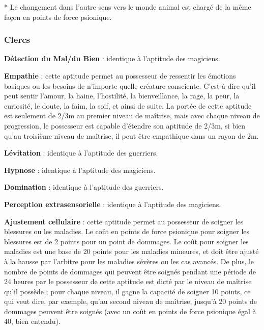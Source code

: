 {\bigskip

* Le changement dans l'autre sens vers le monde animal est chargé de la même façon en points de force psionique.

\subsubsection*{Clercs}

\textbf{Détection du Mal/du Bien} : identique à l'aptitude des magiciens.

\bigskip

\textbf{Empathie} : cette aptitude permet au possesseur de ressentir les émotions basiques ou les besoins de n'importe quelle créature consciente. C'est-à-dire qu'il peut sentir l'amour, la haine, l'hostilité, la bienveillance, la rage, la peur, la curiosité, le doute, la faim, la soif, et ainsi de suite. La portée de cette aptitude est seulement de 2/3m au premier niveau de maîtrise, mais avec chaque niveau de progression, le possesseur est capable d'étendre son aptitude de 2/3m, si bien qu'au troisième niveau de maîtrise, il peut être empathique dans un rayon de 2m.

\bigskip

\textbf{Lévitation} : identique à l'aptitude des guerriers.

\bigskip

\textbf{Hypnose} : identique à l'aptitude des magiciens.

\bigskip

\textbf{Domination} : identique à l'aptitude des guerriers.

\bigskip

\textbf{Perception extrasensorielle} : identique à l'aptitude des magiciens.

\bigskip

\textbf{Ajustement cellulaire} : cette aptitude permet au possesseur de soigner les blessures ou les maladies. Le coût en points de force psionique pour soigner les blessures est de 2 points pour un point de dommages. Le coût pour soigner les maladies est une base de 20 points pour les maladies mineures, et doit être ajusté à la hausse par l'arbitre pour les maladies sévères ou les cas avancés. De plus, le nombre de points de dommages qui peuvent être soignés pendant une période de 24 heures par le possesseur de cette aptitude est dicté par le niveau de maîtrise qu'il possède ; pour chaque niveau, il gagne la capacité de soigner 10 points, ce qui veut dire, par exemple, qu'au second niveau de maîtrise, jusqu'à 20 points de dommages peuvent être soignés (avec un coût en points de force psionique égal à 40, bien entendu).

}
